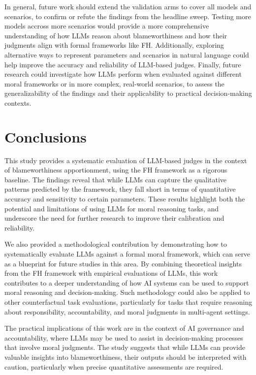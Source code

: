 \documentclass{article}
\begin{document}
In general, future work should extend the validation arms to cover all models and scenarios, to confirm or refute the findings from the headline sweep. Testing more models accross more scenarios would provide a more comprehensive understanding of how LLMs reason about blameworthiness and how their judgments align with formal frameworks like FH. Additionally, exploring alternative ways to represent parameters and scenarios in natural language could help improve the accuracy and reliability of LLM-based judges. Finally, future research could investigate how LLMs perform when evaluated against different moral frameworks or in more complex, real-world scenarios, to assess the generalizability of the findings and their applicability to practical decision-making contexts.

\section{Conclusions}\label{sec:conclusions}

This study provides a systematic evaluation of LLM-based judges in the context of blameworthiness apportionment, using the FH framework as a rigorous baseline. The findings reveal that while LLMs can capture the qualitative patterns predicted by the framework, they fall short in terms of quantitative accuracy and sensitivity to certain parameters. These results highlight both the potential and limitations of using LLMs for moral reasoning tasks, and underscore the need for further research to improve their calibration and reliability.

We also provided a methodological contribution by demonstrating how to systematically evaluate LLMs against a formal moral framework, which can serve as a blueprint for future studies in this area. By combining theoretical insights from the FH framework with empirical evaluations of LLMs, this work contributes to a deeper understanding of how AI systems can be used to support moral reasoning and decision-making. Such methodology could also be applied to other counterfactual task evaluations, particularly for tasks that require reasoning about responsibility, accountability, and moral judgments in multi-agent settings.

The practical implications of this work are in the context of AI governance and accountability, where LLMs may be used to assist in decision-making processes that involve moral judgments. The study suggests that while LLMs can provide valuable insights into blameworthiness, their outputs should be interpreted with caution, particularly when precise quantitative assessments are required.
\end{document}
